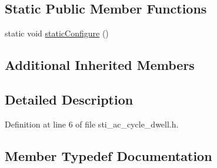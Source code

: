 \subsection*{Static Public Member Functions}
\begin{DoxyCompactItemize}
\item 
static void \hyperlink{structsm__respira__1_1_1ac__cycle__inner__states_1_1StiACCycleDwell_a9b8f167470c70cc180a8abf704f9e8a0}{static\+Configure} ()
\end{DoxyCompactItemize}
\subsection*{Additional Inherited Members}


\subsection{Detailed Description}


Definition at line 6 of file sti\+\_\+ac\+\_\+cycle\+\_\+dwell.\+h.



\subsection{Member Typedef Documentation}
\mbox{\label{structsm__respira__1_1_1ac__cycle__inner__states_1_1StiACCycleDwell_ac7b785d83753f2a557af1ea316548944}} 

